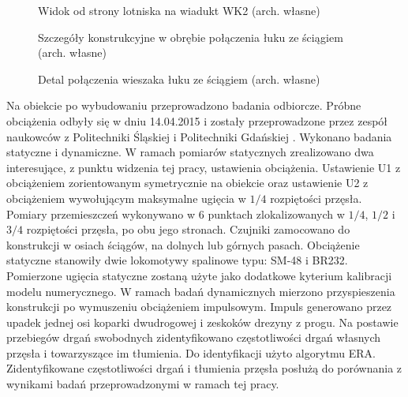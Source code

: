 \begin{figure}[hbt!]
	\centering
	\captionsetup{justification=centering}
	\caption{Widok od strony lotniska na wiadukt WK2 (arch. własne)}
	\label{fig: wk2_foto_widok_front}
\end{figure}
\begin{figure}[hbt!]
	\centering
	\qquad
	\captionsetup{justification=centering}
	\caption{Szczegóły konstrukcyjne w obrębie połączenia łuku ze ściągiem (arch. własne)}
	\label{fig: wk2_foto_wezglowie}
\end{figure}
\begin{figure}[hbt!]
	\centering
	\captionsetup{justification=centering}
	\caption{Detal połączenia wieszaka łuku ze ściągiem (arch. własne)}
	\label{fig: wk2_foto_wieszak}
\end{figure}
Na obiekcie po wybudowaniu przeprowadzono badania odbiorcze. Próbne obciążenia odbyły się w dniu 14.04.2015 i zostały przeprowadzone przez zespół naukowców z Politechniki Śląskiej i Politechniki Gdańskiej \parencite{azinski2015}. Wykonano badania statyczne i dynamiczne. W ramach pomiarów statycznych zrealizowano dwa interesujące, z punktu widzenia tej pracy, ustawienia obciążenia. Ustawienie U1 z obciążeniem zorientowanym symetrycznie na obiekcie oraz ustawienie U2 z obciążeniem wywołującym maksymalne ugięcia w $1/4$ rozpiętości przęsła. Pomiary przemieszczeń wykonywano w 6 punktach zlokalizowanych w $1/4$, $1/2$ i $3/4$ rozpiętości przęsła, po obu jego stronach. Czujniki zamocowano do konstrukcji w osiach ściągów, na dolnych lub górnych pasach. Obciążenie statyczne stanowiły dwie lokomotywy spalinowe typu: SM-48 i BR232. Pomierzone ugięcia statyczne zostaną użyte jako dodatkowe kyterium kalibracji modelu numerycznego.
W ramach badań dynamicznych mierzono przyspieszenia konstrukcji po wymuszeniu obciążeniem impulsowym. Impuls generowano przez upadek jednej osi koparki dwudrogowej i zeskoków drezyny z progu. Na postawie przebiegów drgań swobodnych zidentyfikowano częstotliwości drgań własnych przęsła i towarzyszące im tłumienia. Do identyfikacji użyto algorytmu ERA. Zidentyfikowane częstotliwości drgań i tłumienia przęsła posłużą do porównania z wynikami badań przeprowadzonymi w ramach tej pracy.


